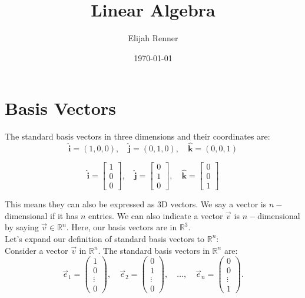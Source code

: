 \documentclass[10pt]{article}
\title{Linear Algebra}
\author{Elijah Renner}
\date{\today}
\theoremstyle{plain}
\theoremstyle{definition}
\theoremstyle{remark}
\begin{document}
\maketitle
\tableofcontents

\section{Basis Vectors}

The standard basis vectors in three dimensions and their coordinates are:\\
\[
\hat{\mathbf{i}} = (1, 0, 0), \quad \hat{\mathbf{j}} = (0, 1, 0), \quad \hat{\mathbf{k}} = (0, 0, 1)
\]

\[
\hat{\mathbf{i}} = 
\begin{bmatrix}
1\\
0\\
0	
\end{bmatrix}
, \quad \hat{\mathbf{j}} = \begin{bmatrix}
 0\\
 1\\
 0	
 \end{bmatrix}
, \quad \hat{\mathbf{k}} = 
\begin{bmatrix}
0\\
0\\
1	
\end{bmatrix}\]

This means they can also be expressed as 3D vectors. We say a vector is \(n-\)dimensional if it has \(n\) entries. We can also indicate a vector \(\vec{v}\) is \(n-\)dimensional by saying \(\vec{v}\in\mathbb{R}^n\). Here, our basis vectors are in \(\mathbb{R}^3\).\\

Let's expand our definition of standard basis vectors to \(\mathbb{R}^n\):\\

Consider a vector \(\vec{v}\) in \(\mathbb{R}^n\). The standard basis vectors in \(\mathbb{R}^n\) are:
\[
\vec{e}_1 = \begin{pmatrix} 1 \\ 0 \\ \vdots \\ 0 \end{pmatrix}, \quad
\vec{e}_2 = \begin{pmatrix} 0 \\ 1 \\ \vdots \\ 0 \end{pmatrix}, \quad \ldots, \quad
\vec{e}_n = \begin{pmatrix} 0 \\ 0 \\ \vdots \\ 1 \end{pmatrix}.
\]
\end{document}
